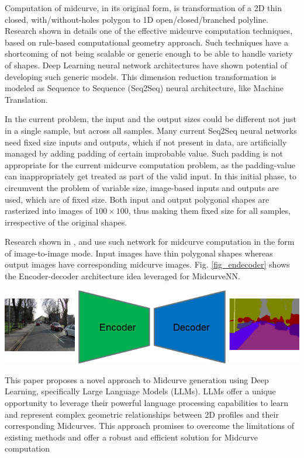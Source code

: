 \documentclass[10pt, conference]{IEEEtran}
\begin{document}
Computation of midcurve, in its original form, is transformation of a 2D thin closed, with/without-holes polygon to 1D open/closed/branched polyline. Research shown in \cite{dimred2017} details one of the effective midcurve computation techniques, based on rule-based computational geometry approach. Such techniques have a shortcoming of not being scalable or generic enough to be able to handle variety of shapes. Deep Learning neural network architectures have  shown potential of developing such generic models. This dimension reduction transformation is modeled as Sequence to Sequence (Seq2Seq) neural architecture, like Machine Translation.

In the current problem, the input and the output sizes could be different not just in a single sample, but across all samples. Many current Seq2Seq neural networks need fixed size inputs and outputs, which if not present in data, are artificially managed by adding padding of certain improbable value. Such padding is not appropriate for the current midcurve computation problem, as the padding-value can inappropriately get treated as part of the valid input. In this initial phase, to circumvent the problem of variable size, image-based inputs and outputs are used, which are of fixed size. Both input and output polygonal shapes are rasterized into images of $100 \times 100$, thus making them fixed size for all samples, irrespective of the original shapes.


Research shown in \cite{midcurvenn2022}, \cite{midcurvenn2023} and \cite{Kulkarni2023} use such network for midcurve computation in the form of image-to-image mode. Input images have thin polygonal shapes whereas output images have corresponding midcurve images. Fig. \ref{fig_endecoder} shows the Encoder-decoder architecture idea leveraged for MidcurveNN.

     \begin{center}
	\includegraphics[width=0.8\linewidth]{images/enc-dec}
	 \cite{DasSeg2019}
	\label{fig_endecoder}
    \end{center}
    
This paper proposes a novel approach to Midcurve generation using Deep Learning, specifically Large Language Models (LLMs). LLMs offer a unique opportunity to leverage their powerful language processing capabilities to learn and represent complex geometric relationships between 2D profiles and their corresponding Midcurves. This approach promises to overcome the limitations of existing methods and offer a robust and efficient solution for Midcurve computation
\end{document}
